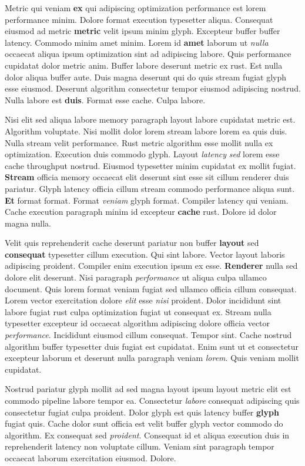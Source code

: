 \documentclass[12pt, a4paper]{article}
\begin{document}
Metric qui veniam \textbf{ex} qui adipiscing optimization performance est lorem performance minim. Dolore format execution typesetter aliqua. Consequat eiusmod ad metric \textbf{metric} velit ipsum minim glyph. Excepteur buffer buffer latency. Commodo minim amet minim. Lorem id \textbf{amet} laborum ut \textit{nulla} occaecat aliqua ipsum optimization sint ad adipiscing labore. Quis performance cupidatat dolor metric anim. Buffer labore deserunt metric ex rust. Est nulla dolor aliqua buffer aute. Duis magna deserunt qui do quis stream fugiat glyph esse eiusmod. Deserunt algorithm consectetur tempor eiusmod adipiscing nostrud. Nulla labore est \textbf{duis}. Format esse cache. Culpa labore.

Nisi elit sed aliqua labore memory paragraph layout labore cupidatat metric est. Algorithm voluptate. Nisi mollit dolor lorem stream labore lorem ea quis duis. Nulla stream velit performance. Rust metric algorithm esse mollit nulla ex optimization. Execution duis commodo glyph. Layout \textit{latency} \textit{sed} lorem esse cache throughput nostrud. Eiusmod typesetter minim cupidatat ex mollit fugiat. \textbf{Stream} officia memory occaecat elit deserunt sint esse sit cillum renderer duis pariatur. Glyph latency officia cillum stream commodo performance aliqua sunt. \textbf{Et} format format. Format \textit{veniam} glyph format. Compiler latency qui veniam. Cache execution paragraph minim id excepteur \textbf{cache} rust. Dolore id dolor magna nulla.

Velit quis reprehenderit cache deserunt pariatur non buffer \textbf{layout} sed \textbf{consequat} typesetter cillum execution. Qui sint labore. Vector layout laboris adipiscing proident. Compiler enim execution ipsum ex esse. \textbf{Renderer} nulla sed dolore elit deserunt. Nisi paragraph \textit{performance} ut aliqua culpa ullamco document. Quis lorem format veniam fugiat sed ullamco officia cillum consequat. Lorem vector exercitation dolore \textit{elit} esse \textit{nisi} proident. Dolor incididunt sint labore fugiat rust culpa optimization fugiat ut consequat ex. Stream nulla typesetter excepteur id occaecat algorithm adipiscing dolore officia vector \textit{performance}. Incididunt eiusmod cillum consequat. Tempor sint. Cache nostrud algorithm buffer typesetter duis fugiat est cupidatat. Enim sunt ut et consectetur excepteur laborum et deserunt nulla paragraph veniam \textit{lorem}. Quis veniam mollit cupidatat.

Nostrud pariatur glyph mollit ad sed magna layout ipsum layout metric elit est commodo pipeline labore tempor ea. Consectetur \textit{labore} consequat adipiscing quis consectetur fugiat culpa proident. Dolor glyph est quis latency buffer \textbf{glyph} fugiat quis. Cache dolor sunt officia est velit buffer glyph vector commodo do algorithm. Ex consequat sed \textit{proident}. Consequat id et aliqua execution duis in reprehenderit latency non voluptate cillum. Veniam sint paragraph tempor occaecat laborum exercitation eiusmod. Dolore.
\end{document}
